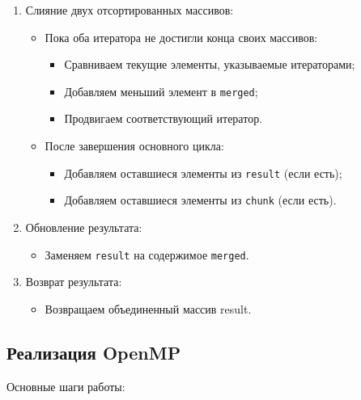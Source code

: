 \documentclass[]{article}
\theoremstyle{remark}
\theoremstyle{definition}
\newcommand{\cpp}[1]{\texttt{#1}}
\begin{document}
\begin{itemize}
\begin{enumerate}
        \item Слияние двух отсортированных массивов:
        \begin{itemize}
            \item Пока оба итератора не достигли конца своих массивов:
            \begin{itemize}
                \item Сравниваем текущие элементы, указываемые итераторами;
                \item Добавляем меньший элемент в \cpp{merged};
                \item Продвигаем соответствующий итератор.
            \end{itemize}
            \item После завершения основного цикла:
            \begin{itemize}
                \item Добавляем оставшиеся элементы из \cpp{result} (если есть);
                \item Добавляем оставшиеся элементы из \cpp{chunk} (если есть).
            \end{itemize}
        \end{itemize}

        \item Обновление результата:
        \begin{itemize}
            \item Заменяем \cpp{result} на содержимое \cpp{merged}.
        \end{itemize}

        \item Возврат результата:
        \begin{itemize}
            \item Возвращаем объединенный массив result.
        \end{itemize}
    \end{enumerate}
\end{itemize}

\subsection{Реализация OpenMP}

Основные шаги работы:
\end{document}

